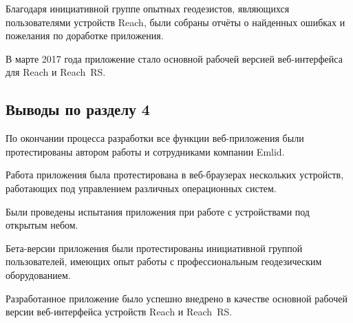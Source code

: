 Благодаря инициативной группе опытных геодезистов, являющихся пользователями устройств Reach, были собраны отчёты о найденных ошибках и пожелания по доработке приложения.

В марте 2017 года приложение стало основной рабочей версией веб-интерфейса для Reach и Reach~RS.



\subsection{Выводы по разделу 4}

\begin{dashitemize}
  \item По окончании процесса разработки все функции веб-приложения были протестированы автором работы и сотрудниками компании Emlid.
  \item Работа приложения была протестирована в веб-браузерах нескольких устройств, работающих под управлением различных операционных систем.
  \item Были проведены испытания приложения при работе с устройствами под открытым небом.
  \item Бета-версии приложения были протестированы инициативной группой пользователей, имеющих опыт работы с профессиональным геодезическим оборудованием.
  \item Разработанное приложение было успешно внедрено в качестве основной рабочей версии веб-интерфейса устройств Reach и Reach~RS.
\end{dashitemize}

\newpage